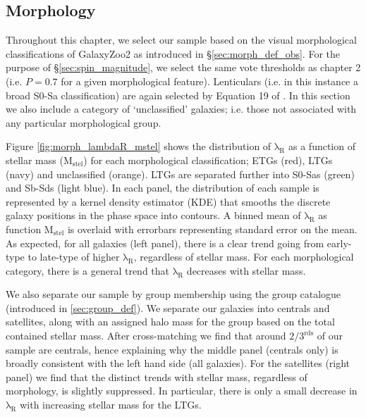 \subsection{Morphology}
Throughout this chapter, we select our sample based on the visual morphological classifications of GalaxyZoo2 \citep[GZ2][]{willett2013} as introduced in \S\ref{sec:morph_def_obs}. For the purpose of \S\ref{sec:spin_magnitude}, we select the same vote thresholds as chapter 2 (i.e. $P = 0.7$ for a given morphological feature). Lenticulars (i.e. in this instance a broad S0-Sa classification) are again selected by Equation 19 of \citet{willett2013}. In this section we also include a category of `unclassified' galaxies; i.e. those not associated with any particular morphological group.

Figure \ref{fig:morph_lambdaR_mstel} shows the distribution of $\mathrm{\lambda_R}$ as a function of stellar mass ($\mathrm{M_{stel}}$) for each morphological classification; ETGs (red), LTGs (navy) and unclassified (orange). LTGs are separated further into S0-Sas (green) and Sb-Sds (light blue). In each panel, the distribution of each sample is represented by a kernel density estimator (KDE) that smooths the discrete galaxy positions in the phase space into contours. A binned mean of $\mathrm{\lambda_R}$ as function $\mathrm{M_{stel}}$ is overlaid with errorbars representing standard error on the mean. As expected, for all galaxies (left panel), there is a clear trend going from early-type to late-type of higher $\mathrm{\lambda_R}$, regardless of stellar mass. For each morphological category, there is a general trend that $\mathrm{\lambda_R}$ decreases with stellar mass. 

We also separate our sample by group membership using the \citep{lim2017} group catalogue (introduced in \ref{sec:group_def}). We separate our galaxies into centrals and satellites, along with an assigned halo mass for the group based on the total contained stellar mass. After cross-matching we find that around $\mathrm{2/3^{rds}}$ of our sample are centrals, hence explaining why the middle panel (centrals only) is broadly consistent with the left hand side (all galaxies). For the satellites (right panel) we find that the distinct trends with stellar mass, regardless of morphology, is slightly suppressed. In particular, there is only a small decrease in $\mathrm{\lambda_R}$ with increasing stellar mass for the LTGs.

